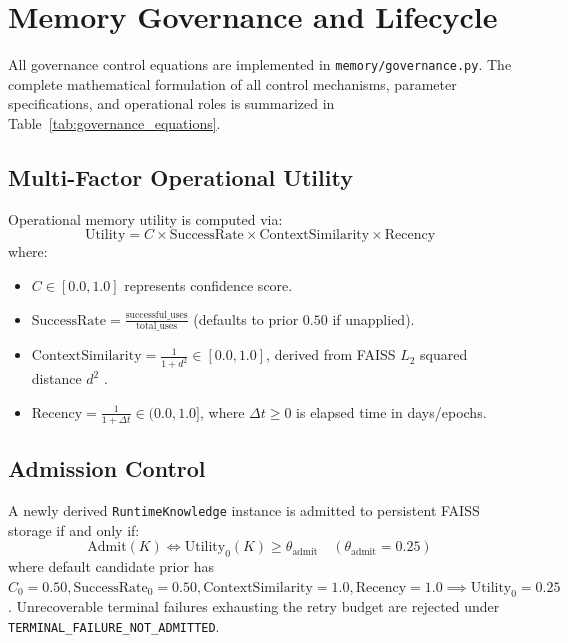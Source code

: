 \documentclass[conference]{IEEEtran}
\begin{document}
\section{Memory Governance and Lifecycle}

All governance control equations are implemented in \texttt{memory/governance.py}. The complete mathematical formulation of all control mechanisms, parameter specifications, and operational roles is summarized in Table~\ref{tab:governance_equations}.



\subsection{Multi-Factor Operational Utility}
Operational memory utility is computed via:
\begin{equation}
\text{Utility} = C \times \text{SuccessRate} \times \text{ContextSimilarity} \times \text{Recency}
\end{equation}
where:
\begin{itemize}
    \item $C \in [0.0, 1.0]$ represents confidence score.
    \item $\text{SuccessRate} = \frac{\text{successful\_uses}}{\text{total\_uses}}$ (defaults to prior $0.50$ if unapplied).
    \item $\text{ContextSimilarity} = \frac{1}{1 + d^2} \in [0.0, 1.0]$, derived from FAISS $L_2$ squared distance $d^2$ \cite{johnson2021faiss}.
    \item $\text{Recency} = \frac{1}{1 + \Delta t} \in (0.0, 1.0]$, where $\Delta t \ge 0$ is elapsed time in days/epochs.
\end{itemize}

\subsection{Admission Control}
A newly derived \texttt{RuntimeKnowledge} instance is admitted to persistent FAISS storage if and only if:
\begin{equation}
\text{Admit}(K) \iff \text{Utility}_0(K) \ge \theta_{\text{admit}} \quad (\theta_{\text{admit}} = 0.25)
\end{equation}
where default candidate prior has $C_0 = 0.50, \text{SuccessRate}_0 = 0.50, \text{ContextSimilarity} = 1.0, \text{Recency} = 1.0 \implies \text{Utility}_0 = 0.25$. Unrecoverable terminal failures exhausting the retry budget are rejected under \texttt{TERMINAL\_FAILURE\_NOT\_ADMITTED}.
\end{document}
